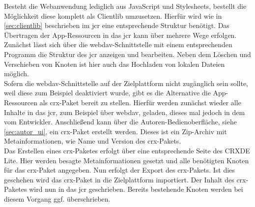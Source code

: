 
Besteht die Webanwendung lediglich aus JavaScript und Stylesheets, bestellt die Möglichkeit diese komplett als Clientlib umzusetzen.
Hierfür wird wie in \autoref{sec:clientlib} beschrieben im \ac{jcr} eine entsprechende Struktur benötigt. Das Übertragen der App-Ressourcen in das \ac{jcr} kann über mehrere Wege erfolgen. \\

Zunächst lässt sich über die \ac{webdav}-Schnittstelle mit einem entsprechenden Programm die Struktur des \ac{jcr} anzeigen und bearbeiten. Neben dem Löschen und Verschieben von Knoten ist hier auch das Hochladen von lokalen Dateien möglich. \\
Sofern die \ac{webdav}-Schnittstelle auf der Zielplattform nicht zugänglich sein sollte, weil diese zum Beispiel deaktiviert wurde, gibt es die Alternative die App-Ressourcen als \ac{crx}-Paket bereit zu stellen. Hierfür werden zunächst wieder alle Inhalte in das \ac{jcr}, zum Beispiel über \ac{webdav}, geladen, dieses mal jedoch in dem vom Entwickler. Anschließend kann über die Autoren-Bedienoberfläche, siehe \autoref{sec:autor_ui}, ein \ac{crx}-Paket erstellt werden. Dieses ist ein Zip-Archiv mit Metainformationen, wie Name und Version des \ac{crx}-Pakets.\\
Das Erstellen eines \ac{crx}-Paketes erfolgt über eine entsprechende Seite des CRXDE Lite. Hier werden besagte Metainformationen gesetzt und alle benötigten Knoten für das \ac{crx}-Paket angegeben. Nun erfolgt der Export des \ac{crx}-Pakets. Ist dies geschehen wird das \ac{crx}-Paket in die Zielplattform importiert. Der Inhalt des \ac{crx}-Paketes wird nun in das \ac{jcr} geschrieben. Bereits bestehende Knoten werden bei diesem Vorgang ggf. überschrieben.
